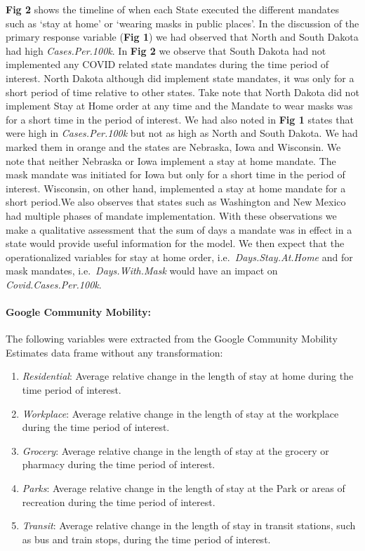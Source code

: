 \documentclass[
]{article}
\providecommand{\tightlist}{%
  \setlength{\itemsep}{0pt}\setlength{\parskip}{0pt}}
\begin{document}
\textbf{Fig 2} shows the timeline of when each State executed the
different mandates such as `stay at home' or `wearing masks in public
places'. In the discussion of the primary response variable (\textbf{Fig
1}) we had observed that North and South Dakota had high
\emph{Cases.Per.100k}. In \textbf{Fig 2} we observe that South Dakota
had not implemented any COVID related state mandates during the time
period of interest. North Dakota although did implement state mandates,
it was only for a short period of time relative to other states. Take
note that North Dakota did not implement Stay at Home order at any time
and the Mandate to wear masks was for a short time in the period of
interest. We had also noted in \textbf{Fig 1} states that were high in
\emph{Cases.Per.100k} but not as high as North and South Dakota. We had
marked them in orange and the states are Nebraska, Iowa and Wisconsin.
We note that neither Nebraska or Iowa implement a stay at home mandate.
The mask mandate was initiated for Iowa but only for a short time in the
period of interest. Wisconsin, on other hand, implemented a stay at home
mandate for a short period.We also observes that states such as
Washington and New Mexico had multiple phases of mandate implementation.
With these observations we make a qualitative assessment that the sum of
days a mandate was in effect in a state would provide useful information
for the model. We then expect that the operationalized variables for
stay at home order, i.e.~\emph{Days.Stay.At.Home} and for mask mandates,
i.e.~\emph{Days.With.Mask} would have an impact on
\emph{Covid.Cases.Per.100k}.

\hypertarget{google-community-mobility}{%
\paragraph{Google Community Mobility:}\label{google-community-mobility}}

The following variables were extracted from the Google Community
Mobility Estimates data frame without any transformation:

\begin{enumerate}
\def\labelenumi{\arabic{enumi}.}
\tightlist
\item
  \emph{Residential}: Average relative change in the length of stay at
  home during the time period of interest.
\item
  \emph{Workplace}: Average relative change in the length of stay at the
  workplace during the time period of interest.
\item
  \emph{Grocery}: Average relative change in the length of stay at the
  grocery or pharmacy during the time period of interest.
\item
  \emph{Parks}: Average relative change in the length of stay at the
  Park or areas of recreation during the time period of interest.
\item
  \emph{Transit}: Average relative change in the length of stay in
  transit stations, such as bus and train stops, during the time period
  of interest.
\end{enumerate}
\end{document}
